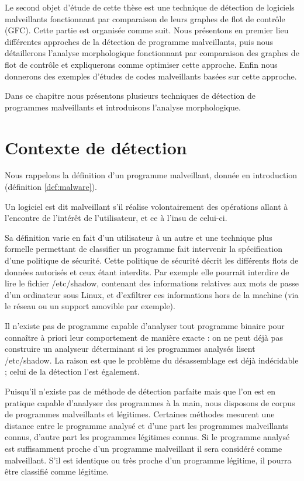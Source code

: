 Le second objet d'étude de cette thèse est une technique de détection de logiciels malveillants fonctionnant par comparaison de leurs graphes de flot de contrôle (GFC).
Cette partie est organisée comme suit. Nous présentons en premier lieu différentes approches de la détection de programme malveillants, puis nous détaillerons l'analyse morphologique fonctionnant par comparaison des graphes de flot de contrôle et expliquerons comme optimiser cette approche. Enfin nous donnerons des exemples d'études de codes malveillants basées sur cette approche.

Dans ce chapitre nous présentons plusieurs techniques de détection de programmes malveillants et introduisons l'analyse morphologique.

\section{Contexte de détection}
Nous rappelons la définition d'un programme malveillant, donnée en introduction (définition \ref{def:malware}).

\begin{defi}
Un logiciel est dit malveillant s'il réalise volontairement des opérations allant à l'encontre de l'intérêt de l'utilisateur, et ce à l'insu de celui-ci.
\label{def:malware}
\end{defi}

Sa définition varie en fait d'un utilisateur à un autre et une technique plus formelle permettant de classifier un programme fait intervenir la spécification d'une politique de sécurité. 
Cette politique de sécurité décrit les différents flots de données autorisés et ceux étant interdits. Par exemple elle pourrait interdire de lire le fichier /etc/shadow, contenant des informations relatives aux mots de passe d'un ordinateur sous Linux, et d'exfiltrer ces informations hors de la machine (via le réseau ou un support amovible par exemple).

Il n'existe pas de programme capable d'analyser tout programme binaire pour connaître à priori leur comportement de manière exacte : on ne peut déjà pas construire un analyseur déterminant si les programmes analysés lisent /etc/shadow.
La raison est que le problème du désassemblage est déjà indécidable ; celui de la détection l'est également.

Puisqu'il n'existe pas de méthode de détection parfaite mais que l'on est en pratique capable d'analyser des programmes à la main, nous disposons de corpus de programmes malveillants et légitimes.
Certaines méthodes mesurent une distance entre le programme analysé et d'une part les programmes malveillants connus, d'autre part les programmes légitimes connus. Si le programme analysé est suffisamment proche d'un programme malveillant il sera considéré comme malveillant. S'il est identique ou très proche d'un programme légitime, il pourra être classifié comme légitime.

